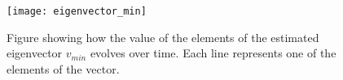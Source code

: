  \begin{figure}[htbp]
 	\centering
 	\texttt{[image: eigenvector\_min]}
 	\caption{Figure showing how the value of the elements of the estimated eigenvector $v_{min}$ evolves over time. Each line represents one of the elements of the vector.}
 	\label{fig:eigenvector_min}
 \end{figure}

